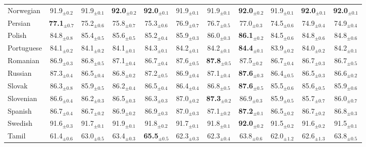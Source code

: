 \begin{table*}[ht]
{\begin{tabular}{lcccccccccc}
Norwegian & 91.9$_{\pm 0.2}$ & 91.9$_{\pm 0.1}$ & \textbf{92.0}$_{\pm 0.2}$ & \textbf{92.0}$_{\pm 0.1}$ & 91.9$_{\pm 0.1}$ & 91.9$_{\pm 0.1}$ & \textbf{92.0}$_{\pm 0.2}$ & 91.9$_{\pm 0.1}$ & \textbf{92.0}$_{\pm 0.1}$ & \textbf{92.0}$_{\pm 0.1}$ \\
Persian & \textbf{77.1}$_{\pm 0.7}$ & 75.2$_{\pm 0.6}$ & 75.8$_{\pm 0.7}$ & 75.3$_{\pm 0.6}$ & 76.9$_{\pm 0.7}$ & 76.7$_{\pm 0.5}$ & 77.0$_{\pm 0.3}$ & 74.5$_{\pm 0.6}$ & 74.9$_{\pm 0.4}$ & 74.9$_{\pm 0.4}$ \\
Polish & 84.8$_{\pm 0.8}$ & 85.4$_{\pm 0.5}$ & 85.6$_{\pm 0.5}$ & 85.2$_{\pm 0.4}$ & 85.9$_{\pm 0.3}$ & 86.0$_{\pm 0.3}$ & \textbf{86.1}$_{\pm 0.2}$ & 84.5$_{\pm 0.6}$ & 84.8$_{\pm 0.6}$ & 84.8$_{\pm 0.6}$ \\
Portuguese & 84.1$_{\pm 0.2}$ & 84.1$_{\pm 0.2}$ & 84.1$_{\pm 0.1}$ & 84.3$_{\pm 0.1}$ & 84.2$_{\pm 0.1}$ & 84.2$_{\pm 0.1}$ & \textbf{84.4}$_{\pm 0.1}$ & 83.9$_{\pm 0.2}$ & 84.0$_{\pm 0.2}$ & 84.2$_{\pm 0.1}$ \\
Romanian & 86.9$_{\pm 0.3}$ & 86.8$_{\pm 0.5}$ & 87.1$_{\pm 0.4}$ & 86.7$_{\pm 0.4}$ & 87.6$_{\pm 0.5}$ & \textbf{87.8}$_{\pm 0.5}$ & 87.5$_{\pm 0.2}$ & 86.7$_{\pm 0.4}$ & 86.7$_{\pm 0.3}$ & 86.7$_{\pm 0.5}$ \\
Russian & 87.3$_{\pm 0.4}$ & 86.5$_{\pm 0.4}$ & 86.8$_{\pm 0.2}$ & 87.2$_{\pm 0.5}$ & 86.9$_{\pm 0.4}$ & 87.1$_{\pm 0.4}$ & \textbf{87.6}$_{\pm 0.3}$ & 86.4$_{\pm 0.5}$ & 86.5$_{\pm 0.3}$ & 86.6$_{\pm 0.2}$ \\
Slovak & 86.3$_{\pm 0.8}$ & 85.9$_{\pm 0.5}$ & 86.2$_{\pm 0.4}$ & 86.5$_{\pm 0.4}$ & 86.4$_{\pm 0.4}$ & 86.8$_{\pm 0.5}$ & \textbf{87.6}$_{\pm 0.5}$ & 85.5$_{\pm 0.6}$ & 85.6$_{\pm 0.5}$ & 85.9$_{\pm 0.6}$ \\
Slovenian & 86.6$_{\pm 0.4}$ & 86.2$_{\pm 0.3}$ & 86.5$_{\pm 0.3}$ & 86.3$_{\pm 0.3}$ & 87.0$_{\pm 0.2}$ & \textbf{87.3}$_{\pm 0.2}$ & 86.9$_{\pm 0.3}$ & 85.9$_{\pm 0.5}$ & 85.7$_{\pm 0.7}$ & 86.0$_{\pm 0.7}$ \\
Spanish & 86.7$_{\pm 0.4}$ & 86.7$_{\pm 0.2}$ & 86.9$_{\pm 0.2}$ & 86.9$_{\pm 0.3}$ & 87.0$_{\pm 0.3}$ & 87.1$_{\pm 0.2}$ & \textbf{87.2}$_{\pm 0.1}$ & 86.5$_{\pm 0.2}$ & 86.7$_{\pm 0.2}$ & 86.8$_{\pm 0.3}$ \\
Swedish & 91.6$_{\pm 0.3}$ & 91.7$_{\pm 0.1}$ & 91.9$_{\pm 0.1}$ & 91.8$_{\pm 0.2}$ & 91.7$_{\pm 0.1}$ & 91.8$_{\pm 0.1}$ & \textbf{92.0}$_{\pm 0.2}$ & 91.5$_{\pm 0.2}$ & 91.6$_{\pm 0.2}$ & 91.5$_{\pm 0.1}$ \\
Tamil & 61.4$_{\pm 0.6}$ & 63.0$_{\pm 0.5}$ & 63.4$_{\pm 0.3}$ & \textbf{65.5}$_{\pm 0.5}$ & 62.3$_{\pm 0.3}$ & 62.3$_{\pm 0.4}$ & 63.8$_{\pm 0.6}$ & 62.0$_{\pm 1.2}$ & 62.6$_{\pm 1.3}$ & 63.8$_{\pm 0.5}$ \\

\end{tabular}}
\end{table*}
